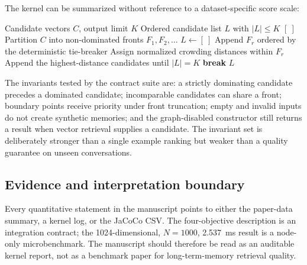 \documentclass[review,12pt]{elsarticle}
\begin{document}
The kernel can be summarized without reference to a dataset-specific score scale:
\begin{algorithm}[H]
\caption{Pareto ranking and Top-$K$ truncation}
\label{alg:pareto-topk}
\begin{algorithmic}[1]
\REQUIRE Candidate vectors $C$, output limit $K$
\ENSURE Ordered candidate list $L$ with $|L|\leq K$
    \RETURN $[\ ]$
\ENDIF
\STATE Partition $C$ into non-dominated fronts $F_1,F_2,\ldots$
\STATE $L\gets[\ ]$
        \STATE Append $F_r$ ordered by the deterministic tie-breaker
    \ELSE
        \STATE Assign normalized crowding distances within $F_r$
        \STATE Append the highest-distance candidates until $|L|=K$
        \STATE \textbf{break}
    \ENDIF
\ENDFOR
\RETURN $L$
\end{algorithmic}
\end{algorithm}

The invariants tested by the contract suite are: a strictly dominating candidate precedes a dominated candidate; incomparable candidates can share a front; boundary points receive priority under front truncation; empty and invalid inputs do not create synthetic memories; and the graph-disabled constructor still returns a result when vector retrieval supplies a candidate. The invariant set is deliberately stronger than a single example ranking but weaker than a quality guarantee on unseen conversations.

\subsection{Evidence and interpretation boundary}
\label{sec:si-boundary}

Every quantitative statement in the manuscript points to either the paper-data summary, a kernel log, or the JaCoCo CSV. The four-objective description is an integration contract; the 1024-dimensional, $N=1000$, 2.537~ms result is a node-only microbenchmark. The manuscript should therefore be read as an auditable kernel report, not as a benchmark paper for long-term-memory retrieval quality.
\end{document}
